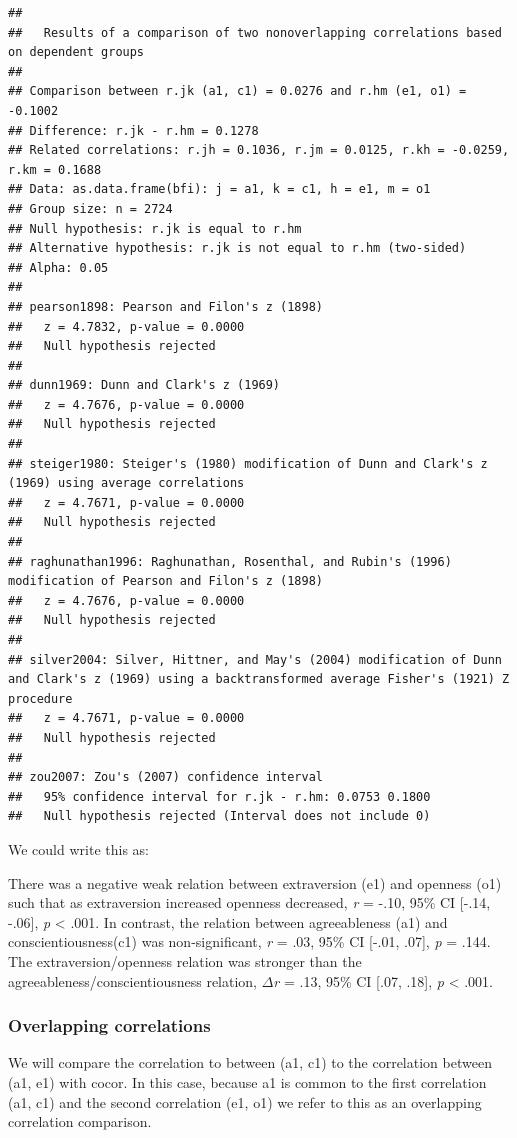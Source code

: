 \documentclass[
]{krantz}
\begin{document}
\begin{verbatim}
## 
##   Results of a comparison of two nonoverlapping correlations based on dependent groups
## 
## Comparison between r.jk (a1, c1) = 0.0276 and r.hm (e1, o1) = -0.1002
## Difference: r.jk - r.hm = 0.1278
## Related correlations: r.jh = 0.1036, r.jm = 0.0125, r.kh = -0.0259, r.km = 0.1688
## Data: as.data.frame(bfi): j = a1, k = c1, h = e1, m = o1
## Group size: n = 2724
## Null hypothesis: r.jk is equal to r.hm
## Alternative hypothesis: r.jk is not equal to r.hm (two-sided)
## Alpha: 0.05
## 
## pearson1898: Pearson and Filon's z (1898)
##   z = 4.7832, p-value = 0.0000
##   Null hypothesis rejected
## 
## dunn1969: Dunn and Clark's z (1969)
##   z = 4.7676, p-value = 0.0000
##   Null hypothesis rejected
## 
## steiger1980: Steiger's (1980) modification of Dunn and Clark's z (1969) using average correlations
##   z = 4.7671, p-value = 0.0000
##   Null hypothesis rejected
## 
## raghunathan1996: Raghunathan, Rosenthal, and Rubin's (1996) modification of Pearson and Filon's z (1898)
##   z = 4.7676, p-value = 0.0000
##   Null hypothesis rejected
## 
## silver2004: Silver, Hittner, and May's (2004) modification of Dunn and Clark's z (1969) using a backtransformed average Fisher's (1921) Z procedure
##   z = 4.7671, p-value = 0.0000
##   Null hypothesis rejected
## 
## zou2007: Zou's (2007) confidence interval
##   95% confidence interval for r.jk - r.hm: 0.0753 0.1800
##   Null hypothesis rejected (Interval does not include 0)
\end{verbatim}

We could write this as:

There was a negative weak relation between extraversion (e1) and openness (o1) such that as extraversion increased openness decreased, \emph{r} = -.10, 95\% CI {[}-.14, -.06{]}, \emph{p} \textless{} .001. In contrast, the relation between agreeableness (a1) and conscientiousness(c1) was non-significant, \emph{r} = .03, 95\% CI {[}-.01, .07{]}, \emph{p} = .144. The extraversion/openness relation was stronger than the agreeableness/conscientiousness relation, \(\Delta\)\emph{r} = .13, 95\% CI {[}.07, .18{]}, \emph{p} \textless{} .001.

\hypertarget{overlapping-correlations}{%
\subsubsection{Overlapping correlations}\label{overlapping-correlations}}

We will compare the correlation to between (a1, c1) to the correlation between (a1, e1) with cocor. In this case, because a1 is common to the first correlation (a1, c1) and the second correlation (e1, o1) we refer to this as an overlapping correlation comparison.
\end{document}
